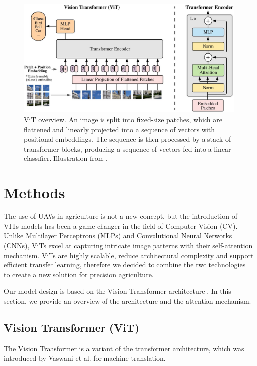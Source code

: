 
\begin{figure}[t!]
    \includegraphics[width=\linewidth]{../images/ViT}
    \caption{ViT overview. An image is split into fixed-size patches, which are flattened and linearly projected into a sequence of vectors with positional embeddings. The sequence is then processed by a stack of transformer blocks, producing a sequence of vectors fed into a linear classifier. Illustration from \cite{dosovitskiy2021image}.}
    \label{fig:ViT}
    \centering
\end{figure}

\section{Methods}
\label{sec:methods}

The use of UAVs in agriculture is not a new concept, but the introduction of VITs models has been a game changer in the field of Computer Vision (CV).
Unlike Multilayer Perceptrons (MLPs) and Convolutional Neural Networks (CNNs), ViTs excel at capturing intricate image patterns with their self-attention mechanism.
ViTs are highly scalable, reduce architectural complexity and support efficient transfer learning, therefore we decided to combine the two technologies to create a new solution for precision agriculture.

Our model design is based on the Vision Transformer architecture \cite{dosovitskiy2021image}.
In this section, we provide an overview of the architecture and the attention mechanism.

\subsection{Vision Transformer (ViT)}
\label{sec:ViT_overview}

The Vision Transformer is a variant of the transformer architecture, which was introduced by Vaswani et al. \cite{vaswani2023attention} for machine translation.

